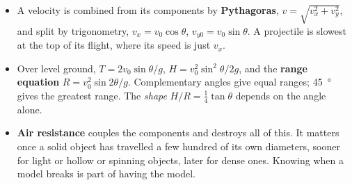 \documentclass[11pt,twoside,openany]{book}
\begin{document}
\begin{itemize}
  \item A velocity is combined from its components by \textbf{Pythagoras}, $v = \sqrt{v_x^2+v_y^2}$, and split by trigonometry, $v_x = v_0\cos\theta$, $v_{y0} = v_0\sin\theta$. A projectile is slowest at the top of its flight, where its speed is just $v_x$.
  \item Over level ground, $T = 2v_0\sin\theta/g$, $H = v_0^2\sin^2\theta/2g$, and the \textbf{range equation} $R = v_0^2\sin2\theta/g$. Complementary angles give equal ranges; \SI{45}{\degree} gives the greatest range. The \emph{shape} $H/R = \tfrac14\tan\theta$ depends on the angle alone.
  \item \textbf{Air resistance} couples the components and destroys all of this. It matters once a solid object has travelled a few hundred of its own diameters, sooner for light or hollow or spinning objects, later for dense ones. Knowing when a model breaks is part of having the model.
\end{itemize}
\end{document}
